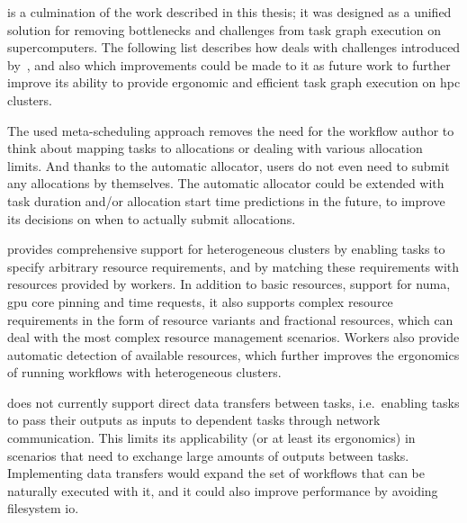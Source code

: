 \hyperqueue{} is a culmination of the work described in this thesis; it was
designed as a unified solution for removing bottlenecks and challenges from task graph execution on
supercomputers. The following list describes how \hyperqueue{} deals with challenges
introduced by~, and also which improvements could be made to it as future
work to further improve its ability to provide ergonomic and efficient task graph execution on
\gls{hpc} clusters.
\begin{description}[wide=0pt]
	\item[Interaction with allocation manager] The used meta-scheduling approach removes the need for the workflow author to think about mapping
		tasks to allocations or dealing with various allocation limits. And thanks to the automatic
		allocator, users do not even need to submit any allocations by themselves. The automatic allocator
		could be extended with task duration and/or allocation start time predictions in the future, to
		improve its decisions on when to actually submit allocations.
	\item[Cluster heterogeneity] \hyperqueue{} provides comprehensive support for heterogeneous
		clusters by enabling tasks to specify arbitrary resource requirements, and by matching these
		requirements with resources provided by workers. In addition to basic resources, support for
		\gls{numa}, \gls{gpu} core pinning and time requests, it also
		supports complex resource requirements in the form of resource variants and fractional resources,
		which can deal with the most complex resource management scenarios. Workers also provide automatic
		detection of available resources, which further improves the ergonomics of running workflows with
		heterogeneous clusters.
	\item[Data transfers] \hyperqueue{} does not currently support direct data transfers
		between tasks, i.e.\ enabling tasks to pass their outputs as inputs to dependent tasks through
		network communication. This limits its applicability (or at least its ergonomics) in scenarios that
		need to exchange large amounts of outputs between tasks. Implementing data transfers would expand
		the set of workflows that can be naturally executed with it, and it could also improve performance
		by avoiding filesystem \gls{io}.


\end{description}
